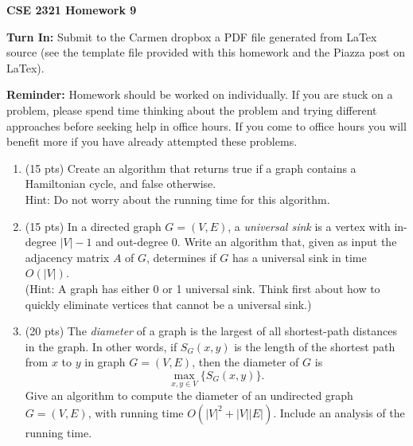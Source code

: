 \documentclass[14pt]{extarticle}
\begin{document}
\textbf{CSE 2321 Homework 9}

\textbf{Turn In:} Submit to the Carmen dropbox a PDF file generated from LaTex source (see the template file provided with this homework and the Piazza post on LaTex).

\textbf{Reminder:} Homework should be worked on individually. If you are stuck on a problem, please spend time thinking about the problem and trying different approaches before seeking help in office hours. If you come to office hours you will benefit more if you have already attempted these problems. 

\begin{enumerate}

\item (15 pts) Create an algorithm that returns true if a graph contains a Hamiltonian cycle, and false otherwise.\\ Hint: Do not worry about the running time for this algorithm.\\

\item (15 pts) In a directed graph $G = (V, E)$, a \textit{universal sink} is a vertex with in-degree $|V| - 1$ and out-degree $0$. Write an algorithm that, given as input the adjacency matrix $A$ of $G$, determines if $G$ has a universal sink in time $O(|V|)$.\\
(Hint: A graph has either 0 or 1 universal sink. Think first about how to quickly eliminate vertices that cannot be a universal sink.)\\

\item (20 pts) The \textit{diameter} of a graph is the largest of all shortest-path distances in the graph. In other words, if $S_G(x, y)$ is the length of the shortest path from $x$ to $y$ in graph $G=(V, E)$, then the diameter of $G$ is 
\[
\max_{x, y \in V}\{S_G(x, y)\}. 
\]
Give an algorithm to compute the diameter of an undirected graph $G = (V, E)$, with running time $O\left(|V|^2 + |V||E|\right)$. Include an analysis of the running time.


\end{enumerate}
\end{document}
